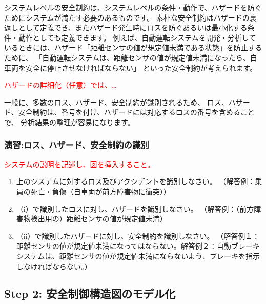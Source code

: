 システムレベルの安全制約は、システムレベルの条件・動作で、ハザードを防ぐためにシステムが満たす必要のあるものです。
素朴な安全制約はハザードの裏返しとして定義でき、またハザード発生時にロスを防ぐあるいは最小化する条件・動作としても定義できます。
例えば、自動運転システムを開発・分析しているときには、ハザード「距離センサの値が規定値未満である状態」を防止するために、
「自動運転システムは、距離センサの値が規定値未満になったら、自車両を安全に停止させなければならない」
といった安全制約が考えられます。

\textcolor{red}{ハザードの詳細化（任意）では、…}

一般に、多数のロス、ハザード、安全制約が識別されるため、
ロス、ハザード、安全制約は、番号を付け、ハザードには対応するロスの番号を含めることで、
分析結果の整理が容易になります。

\subsubsection{演習:ロス、ハザード、安全制約の識別} %

\textcolor{red}{システムの説明を記述し、図を挿入すること。}

\begin{enumerate}
    \item 上のシステムに対するロス及びアクシデントを識別しなさい。
    （解答例：乗員の死亡・負傷（自車両が前方障害物に衝突））
    \item （i）で識別したロスに対し、ハザードを識別しなさい。
    （解答例：（前方障害物検出用の）距離センサの値が規定値未満）
    \item （ii）で識別したハザードに対し、安全制約を識別しなさい。
    （解答例１：距離センサの値が規定値未満になってはならない。解答例２：自動ブレーキシステムは、距離センサの値が規定値未満にならないよう、ブレーキを指示しなければならない。）
\end{enumerate}

\subsection{Step 2: 安全制御構造図のモデル化}


